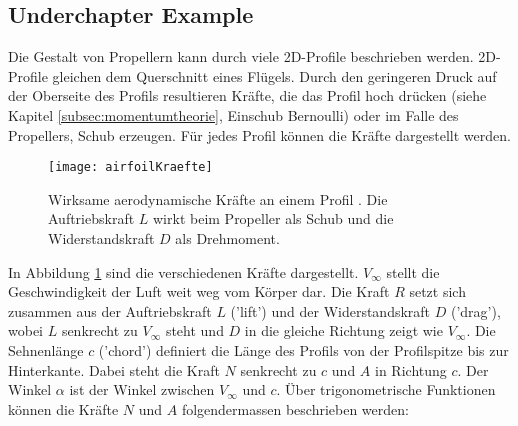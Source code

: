 \subsection{Underchapter Example}
\label{subsec:underchapterexample}

Die Gestalt von Propellern kann durch viele 2D-Profile beschrieben werden. 2D-Profile gleichen dem Querschnitt eines Flügels. Durch den geringeren Druck auf der Oberseite des Profils resultieren Kräfte, die das Profil hoch drücken (siehe Kapitel \ref{subsec:momentumtheorie}, Einschub Bernoulli) oder im Falle des Propellers, Schub erzeugen. Für jedes Profil können die Kräfte dargestellt werden.

\vspace{0.05cm}

\begin{figure}[htb!]
\begin{center}
\texttt{[image: airfoilKraefte]}
\caption[Wirksame aerodynamische Kräfte an einem Profil]{Wirksame aerodynamische Kräfte an einem Profil \cite{aeroKraefte}. Die Auftriebskraft $L$ wirkt beim Propeller als Schub und die Widerstandskraft $D$ als Drehmoment.}
\label{fig:airfoilKraefte}
\end{center}
\end{figure}

\vspace{0.05cm}

In Abbildung \ref{fig:airfoilKraefte} sind die verschiedenen Kräfte dargestellt. $V_\infty$ stellt die Geschwindigkeit der Luft weit weg vom Körper dar. Die Kraft $R$ setzt sich zusammen aus der Auftriebskraft $L$ ('lift') und der Widerstandskraft $D$ ('drag'), wobei $L$ senkrecht zu $V_\infty$ steht und $D$ in die gleiche Richtung zeigt wie $V_\infty$.
Die Sehnenlänge $c$ ('chord') definiert die Länge des Profils von der Profilspitze bis zur Hinterkante. Dabei steht die Kraft $N$ senkrecht zu $c$ und $A$ in Richtung $c$. Der Winkel $\alpha$ ist der Winkel zwischen $V_\infty$ und $c$.
Über trigonometrische Funktionen können die Kräfte $N$ und $A$ folgendermassen beschrieben werden:
\newpage

